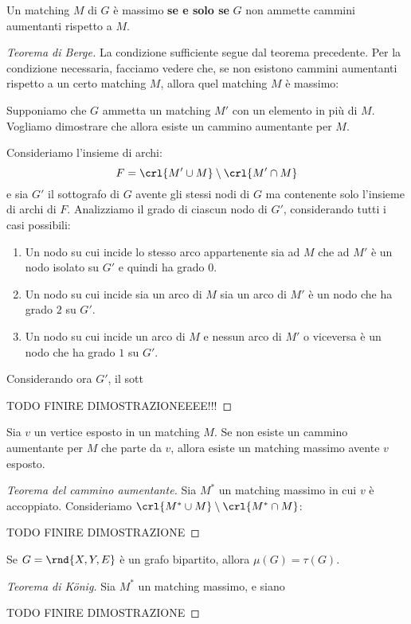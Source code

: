 \documentclass[\main/main.tex]{subfiles}
\begin{document}
\begin{theorem}
  Un matching \(M\) di \(G\) è massimo \textbf{se e solo se} \(G\) non ammette cammini aumentanti rispetto a \(M\).
\end{theorem}
\begin{proof}[Teorema di Berge]
  La condizione sufficiente segue dal teorema precedente. Per la condizione necessaria, facciamo vedere che, se non esistono cammini aumentanti rispetto a un certo matching \(M\), allora quel matching \(M\) è massimo:

  Supponiamo che \(G\) ammetta un matching \(M'\) con un elemento in più di \(M\). Vogliamo dimostrare che allora esiste un cammino aumentante per \(M\).

  Consideriamo l'insieme di archi:
  \[
    F = \crl{M'\cup M}\setminus\crl{M' \cap M}
  \]
  e sia \(G'\) il sottografo di \(G\) avente gli stessi nodi di \(G\) ma contenente solo l'insieme di archi di \(F\). Analizziamo il grado di ciascun nodo di \(G'\), considerando tutti i casi possibili:
  \begin{enumerate}
    \item Un nodo su cui incide lo stesso arco appartenente sia ad \(M\) che ad \(M'\) è un nodo isolato su \(G'\) e quindi ha grado 0.
    \item Un nodo su cui incide sia un arco di \(M\) sia un arco di \(M'\) è un nodo che ha grado \(2\) su \(G'\).
    \item Un nodo su cui incide un arco di \(M\) e nessun arco di \(M'\) o viceversa è un nodo che ha grado \(1\) su \(G'\).
  \end{enumerate}
  Considerando ora \(G'\), il sott

  TODO FINIRE DIMOSTRAZIONEEEE!!!
\end{proof}

\begin{theorem}
  Sia \(v\) un vertice esposto in un matching \(M\). Se non esiste un cammino aumentante per \(M\) che parte da \(v\), allora esiste un matching massimo avente \(v\) esposto.
\end{theorem}

\begin{proof}[Teorema del cammino aumentante]
  Sia \(M^*\) un matching massimo in cui \(v\) è accoppiato. Consideriamo \(\crl{M^*\cup M}\setminus\crl{M^* \cap M}\):

  TODO FINIRE DIMOSTRAZIONE
\end{proof}

\begin{theorem}
  Se \(G=\rnd{X, Y, E}\) è un grafo bipartito, allora \(\mu(G) = \tau(G)\).
\end{theorem}

\begin{proof}[Teorema di König]
  Sia \(M^*\) un matching massimo, e siano

  TODO FINIRE DIMOSTRAZIONE
\end{proof}
\end{document}
